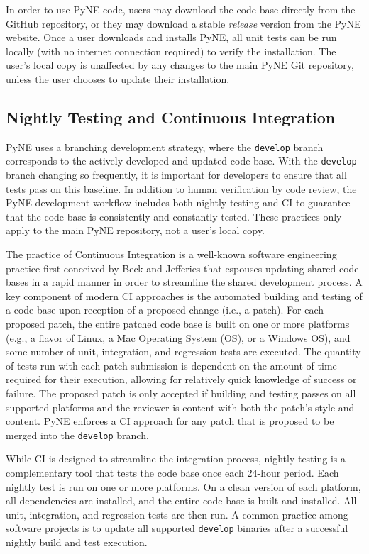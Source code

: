 \documentclass{anstrans}
\begin{document}
In order to use PyNE code, users may download the code base directly from the GitHub repository, or
they may download a stable \emph{release} version from the PyNE website. Once a
user downloads and installs PyNE, all unit tests can be run locally
(with no internet connection required) to verify the installation. The user's local
copy is unaffected by any changes to the main PyNE Git repository, unless the
user chooses to update their installation.

\subsection{Nightly Testing and Continuous Integration} 

PyNE uses a branching
development strategy, where the \texttt{develop} branch corresponds to the
actively developed and updated code base.
With the \texttt{develop} branch changing so frequently, it is important for developers to ensure that all tests pass on this baseline. 
In addition to human verification by code review, the PyNE
development workflow includes both nightly testing and CI to
guarantee that the code base is consistently and constantly tested. These practices only apply to the main PyNE repository, not a user's local copy.

The practice of Continuous Integration is a well-known software engineering
practice first conceived by Beck and Jefferies \cite{beck1998extreme} that
espouses updating shared code bases in a rapid manner in order to streamline the
shared development process. A key component of modern CI approaches is the
automated building and testing of a code base upon reception of a proposed
change (i.e., a patch). For each proposed patch, the entire patched code base is
built on one or more platforms (e.g., a flavor of Linux, a Mac Operating System
(OS), or a Windows OS), and some number of unit, integration, and regression
tests are executed. The quantity of tests run with each patch submission is
dependent on the amount of time required for their execution, allowing for
relatively quick knowledge of success or failure. The proposed patch is only
accepted if building and testing passes on all supported platforms and the
reviewer is content with both the patch's style and content. PyNE enforces a CI
approach for any patch that is proposed to be merged into the \texttt{develop}
branch.

While CI is designed to streamline the integration process, nightly testing is a
complementary tool that tests the code base once each 24-hour
period. Each nightly test is run on one or more platforms. On a clean version of
each platform, all dependencies are installed, and the entire code base is built
and installed. All unit, integration, and regression tests are then run. 
A common practice among software projects is to update all supported \texttt{develop}
binaries after a successful nightly build and test execution.
\end{document}
